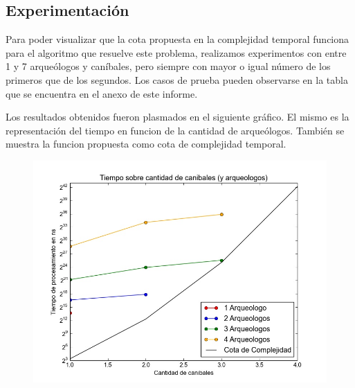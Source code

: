 
    \subsection{Experimentación}

	Para poder visualizar que la cota propuesta en la complejidad temporal funciona para el algoritmo que resuelve este problema, realizamos experimentos con entre 1 y 7 arqueólogos y caníbales, pero siempre con mayor o igual número de los primeros que de los segundos. Los casos de prueba pueden observarse en la tabla que se encuentra en el anexo de este informe.

  Los resultados obtenidos fueron plasmados en el siguiente gráfico. El mismo es la representación del tiempo en funcion de la cantidad de arqueólogos. También se muestra la funcion propuesta como cota de complejidad temporal.

  \begin{figure}[H]
      \begin{center}
        \includegraphics[width=1.1\columnwidth]{imagenes/ej1exp1NuevaVersion.jpeg}
        \caption{}
      \end{center}
  \end{figure}


